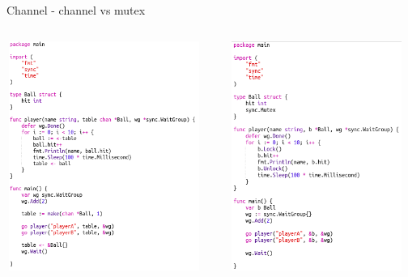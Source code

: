 \documentclass{beamer}
\begin{document}
\begin{frame}[fragile]{Channel - channel vs mutex}

\begin{columns}
    \begin{column}{0.5\textwidth}
            \centerline{\includegraphics[width=10cm,height=7.5cm,keepaspectratio]{screen1.png}}
    \end{column}
    
    \begin{column}{0.5\textwidth}
            \centerline{\includegraphics[width=10cm,height=7.5cm,keepaspectratio]{screen2.png}}
    \end{column}
           
\end{columns}
    
\end{frame}
\end{document}
